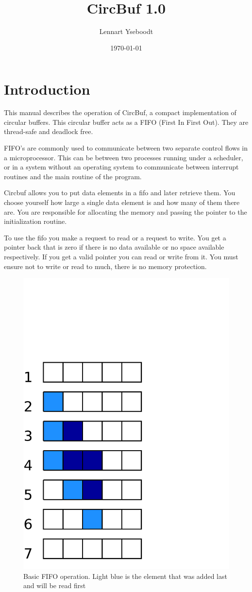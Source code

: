 \documentclass[a4paper]{article}
\begin{document}
	\title{CircBuf 1.0}
	\author{Lennart Yseboodt}
	\date{\today}

	\maketitle

	\tableofcontents

	\lstset{language=C,basicstyle=\small}

\setlength{\parindent}{0pt}
\setlength{\parskip}{1ex minus 0.2ex plus 0.5ex}
	
\section{Introduction}
This manual describes the operation of CircBuf, a compact implementation of circular buffers.
This circular buffer acts as a FIFO (First In First Out). They are thread-safe and deadlock free.

FIFO's are commonly used to communicate between two separate control flows in a microprocessor.
This can be between two processes running under a scheduler, or in a system without an operating system
to communicate between interrupt routines and the main routine of the program.

Circbuf allows you to put data elements in a fifo and later retrieve them. You choose yourself how large
a single data element is and how many of them there are. You are responsible for allocating the memory
and passing the pointer to the initialization routine.

To use the fifo you make a request to read or a request to write. You get a pointer back that is zero if
there is no data available or no space available respectively. If you get a valid pointer you can read or
write from it. You must ensure not to write or read to much, there is no memory protection.

\begin{figure}
	\centering
	\includegraphics[width=.4\textwidth]{diagrams/fifo.pdf}
	\caption{Basic FIFO operation. Light blue is the element that was added last and will be read first}
	\label{fig:fifo}
\end{figure}
\end{document}
